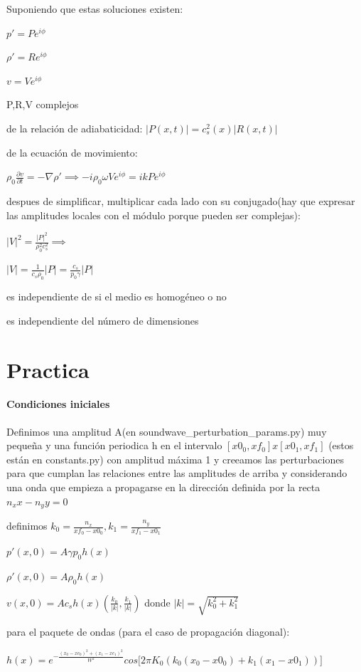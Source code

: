 \documentclass{article}
\begin{document}
\begin{description}  
\item Suponiendo que estas soluciones existen:
\item $p\prime = P e^{i\phi}$
\item $\rho\prime = R e^{i\phi}$
\item $v = V e^{i\phi}$
\item P,R,V  complejos
\item de la relación de adiabaticidad: $|P(x,t)| = c_s^{2}(x) |R(x,t)|$
\item de la ecuación de movimiento: 
\item $\rho_0 \frac{\partial v}{\partial t} = -\nabla \rho\prime \implies -i \rho_0 \omega V e^{i\phi} = i k P e^{i\phi}$
\item despues de simplificar,  multiplicar cada lado con su conjugado(hay que expresar las amplitudes locales con el módulo porque pueden ser complejas):
\item  $|V|^2 = \frac{|P|^2}{\rho_0^{2} c_s^2} \implies$ 
\item $|V|= \frac{1}{c_s \rho_0} |P| = \frac{c_s}{p_0 \gamma} |P|$ 

\item es independiente de si el medio es homogéneo o no 
\item es independiente del número de dimensiones

\end{description}  

\section*{Practica}


\paragraph{Condiciones iniciales}	
\begin{description}
\item Definimos una amplitud A(en soundwave\_perturbation\_params.py) muy pequeña y una función periodica h en el intervalo $[x0_0, xf_0] x [x0_1, xf_1]$ (estos están en constants.py) con amplitud máxima 1 y creeamos las perturbaciones para que cumplan las relaciones entre las amplitudes de arriba y considerando una onda que empieza a propagarse en la dirección definida por la recta $n_x x - n_y y = 0$
\item definimos $ k_0 = \frac{n_x}{xf_0 - x0_0}, k_1 =  \frac{n_y}{xf_1 - x0_1}$ 
\item  $p\prime(x,0) = A \gamma p_0 h(x) $ 
\item  $\rho\prime(x,0) = A \rho_0 h(x) $
\item  $v(x, 0) =  A c_s h(x) (\frac{k_0}{|k|} , \frac{k_1}{|k|}) $ donde $|k| = \sqrt{k_0^2 + k_1^2} $
\item para el paquete de ondas (para el caso de propagación diagonal):
\begin{center}
\item $h(x) = e^{- \frac{(x_0-xc_0)^2 + (x_1 - xc_1)^2 }{W^2}} cos\big[2 \pi  K_0 (k_0(x_0 - x0_0) +  k_1(x_1 - x0_1)) \big] $
\end{center}
\end{description}
\end{document}
